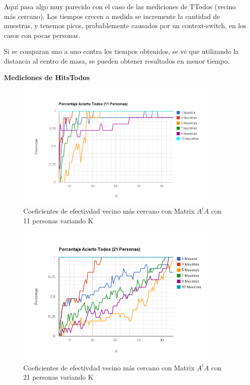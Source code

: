 Aquí pasa algo muy parecido con el caso de las mediciones de TTodos (vecino más cercano). Los
tiempos crecen a medida se incremente la cantidad de muestras, y tenemos picos, probablemente causados por un context-switch, en los
casos con pocas personas.

Si se comparan uno a uno contra los tiempos obtenidos, se ve que utilizando la distancia al centro de masa, se pueden obtener resultados en menor tiempo.

\textbf{Mediciones de HitsTodos }

\begin{figure}[H] \includegraphics[width=0.90\textwidth]{img/image10.png} \caption{Coeficientes de
    efectivdad vecino más cercano con Matrix $A^tA$ con 11 personas variando K} \end{figure}

\begin{figure}[H] \includegraphics[width=0.90\textwidth]{img/image11.png} \caption{Coeficientes de
    efectivdad vecino más cercano con Matrix $A^tA$ con 21 personas variando K} \end{figure}

